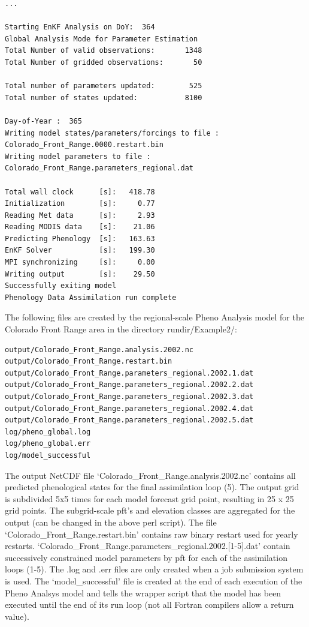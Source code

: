 \documentclass[a4paper,12pt]{article}
\begin{document}
\begin{verbatim}
...

Starting EnKF Analysis on DoY:  364
Global Analysis Mode for Parameter Estimation
Total Number of valid observations:       1348
Total Number of gridded observations:       50

Total number of parameters updated:        525
Total number of states updated:           8100

Day-of-Year :  365
Writing model states/parameters/forcings to file : Colorado_Front_Range.0000.restart.bin
Writing model parameters to file : Colorado_Front_Range.parameters_regional.dat

Total wall clock      [s]:   418.78
Initialization        [s]:     0.77
Reading Met data      [s]:     2.93
Reading MODIS data    [s]:    21.06
Predicting Phenology  [s]:   163.63
EnKF Solver           [s]:   199.30
MPI synchronizing     [s]:     0.00
Writing output        [s]:    29.50
Successfully exiting model
Phenology Data Assimilation run complete

\end{verbatim}
The following files are created by the regional-scale Pheno Analysis model for the Colorado Front Range area in the directory rundir/Example2/:
\begin{verbatim}
output/Colorado_Front_Range.analysis.2002.nc
output/Colorado_Front_Range.restart.bin
output/Colorado_Front_Range.parameters_regional.2002.1.dat
output/Colorado_Front_Range.parameters_regional.2002.2.dat
output/Colorado_Front_Range.parameters_regional.2002.3.dat
output/Colorado_Front_Range.parameters_regional.2002.4.dat
output/Colorado_Front_Range.parameters_regional.2002.5.dat
log/pheno_global.log
log/pheno_global.err
log/model_successful
\end{verbatim}
The output NetCDF file `Colorado\_Front\_Range.analysis.2002.nc' contains all predicted phenological states  for the final assimilation loop (5). The output grid is subdivided 5x5 times for each model forecast grid point, resulting in 25 x 25 grid points. The subgrid-scale pft's and elevation classes are aggregated for the output (can be changed in the above perl script). The file `Colorado\_Front\_Range.restart.bin' contains raw binary restart used for yearly restarts. `Colorado\_Front\_Range.parameters\_regional.2002.[1-5].dat' contain successively constrained model parameters by pft for each of the assimilation loops (1-5). The .log and .err files are only created when a job submission system is used. The `model\_successful' file is created at the end of each execution of the Pheno Analsys model and tells the wrapper script that the model has been executed until the end of its run loop (not all Fortran compilers allow a return value).
\end{document}
